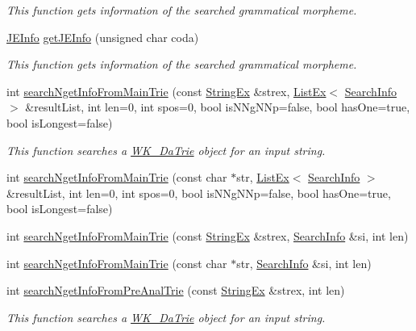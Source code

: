 \begin{CompactItemize}
\begin{CompactList}\small\item\em This function gets information of the searched grammatical morpheme. \item\end{CompactList}\item 
\hyperlink{classJEInfo}{JEInfo} \hyperlink{classkmaOrange_1_1Dictionary_37f831e5568bb08887804e486b7d6bea}{getJEInfo} (unsigned char coda)
\begin{CompactList}\small\item\em This function gets information of the searched grammatical morpheme. \item\end{CompactList}\item 
int \hyperlink{classkmaOrange_1_1Dictionary_fe298ec3ba608e9580b3595608e68961}{searchNgetInfoFromMainTrie} (const \hyperlink{classStringEx}{StringEx} \&strex, \hyperlink{classListEx}{ListEx}$<$ \hyperlink{classSearchInfo}{SearchInfo} $>$ \&resultList, int len=0, int spos=0, bool isNNgNNp=false, bool hasOne=true, bool isLongest=false)
\begin{CompactList}\small\item\em This function searches a \hyperlink{classkmaOrange_1_1WK__DaTrie}{WK\_\-DaTrie} object for an input string. \item\end{CompactList}\item 
int \hyperlink{classkmaOrange_1_1Dictionary_7bac38f3c179eb270b9b02466252f6f1}{searchNgetInfoFromMainTrie} (const char $\ast$str, \hyperlink{classListEx}{ListEx}$<$ \hyperlink{classSearchInfo}{SearchInfo} $>$ \&resultList, int len=0, int spos=0, bool isNNgNNp=false, bool hasOne=true, bool isLongest=false)
\item 
int \hyperlink{classkmaOrange_1_1Dictionary_1c0ebb7bbf16dff682227a7d48d2182e}{searchNgetInfoFromMainTrie} (const \hyperlink{classStringEx}{StringEx} \&strex, \hyperlink{classSearchInfo}{SearchInfo} \&si, int len)
\item 
int \hyperlink{classkmaOrange_1_1Dictionary_dac1a4e1a10b17094b78caa60fc4d4be}{searchNgetInfoFromMainTrie} (const char $\ast$str, \hyperlink{classSearchInfo}{SearchInfo} \&si, int len)
\item 
int \hyperlink{classkmaOrange_1_1Dictionary_ff6f74c242f04a96d3be83168ad56504}{searchNgetInfoFromPreAnalTrie} (const \hyperlink{classStringEx}{StringEx} \&strex, int len)
\begin{CompactList}\small\item\em This function searches a \hyperlink{classkmaOrange_1_1WK__DaTrie}{WK\_\-DaTrie} object for an input string. \item\end{CompactList}\item 

\end{CompactItemize}
